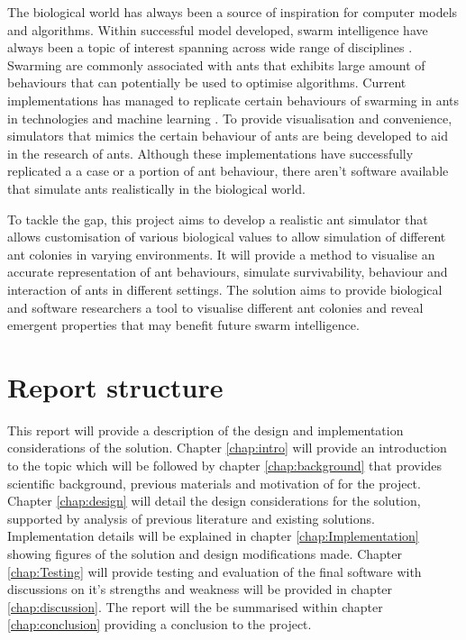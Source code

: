\documentclass[a4paper, oneside, 11pt]{report}
\begin{document}
The biological world has always been a source of inspiration for computer models and algorithms. Within successful model developed, swarm intelligence have always been a topic of interest spanning across wide range of disciplines \citep{Swarm_Intro}. Swarming are commonly associated with ants that exhibits large amount of behaviours that can potentially be used to optimise algorithms. Current implementations has managed to replicate certain behaviours of swarming in ants in technologies \citep{Ant_Implementation_Tech_1} \citep{Ant_Implementation_Tech_2} and machine learning \citep{Ant_Implementation_ML}. To provide visualisation and convenience, simulators \citep{Ant_Simulator} \citep{Ant_Simulator_Revisited} \citep{Ant_Simulator_Intro}  that mimics the certain behaviour of ants are being developed to aid in the research of ants. Although these implementations have successfully replicated a a case or a portion of ant behaviour, there aren't software available that simulate ants realistically in the biological world.

To tackle the gap, this project aims to develop a realistic ant simulator that allows customisation of various biological values to allow simulation of different ant colonies in varying environments. It will provide a method to visualise an accurate representation of ant behaviours, simulate survivability, behaviour and interaction of ants in different settings. The solution aims to provide biological and software researchers a tool to visualise different ant colonies and reveal emergent properties that may benefit future swarm intelligence.

\section{Report structure}
This report will provide a description of the design and implementation considerations of the solution. Chapter \ref{chap:intro} will provide an introduction to the topic which will be followed by chapter \ref{chap:background} that provides scientific background, previous materials and motivation of for the project. Chapter \ref{chap:design} will detail the design considerations for the solution, supported by analysis of previous literature and existing solutions. Implementation details will be explained in chapter \ref{chap:Implementation} showing figures of the solution and design modifications made. Chapter \ref{chap:Testing} will provide testing and evaluation of the final software with discussions on it's strengths and weakness will be provided in chapter \ref{chap:discussion}. The report will the be summarised within chapter \ref{chap:conclusion} providing a conclusion to the project.
\end{document}
